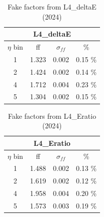 \begin{minipage}[t]{\textwidth}
  \begin{table}[H]
    \caption{Fake factors computed for several Loose', for year 2023}
    \label{tab:fjy_2023_loose1}
  \end{table}
\end{minipage}



\begin{minipage}[t]{\textwidth}

  \begin{minipage}[t]{0.32\textwidth}
    \begin{table}[H]
      \centering
      \begin{tabular}{|c|c|c|c|}
        \hline
        \multicolumn{4}{|c|}{\textbf{L4\_deltaE}} \\
        \hline
        $\eta$ bin & ff & $\sigma_{ff}$ & \% \\
        \hline
        1 & 1.323 & 0.002 & 0.15 \% \\
        \hline
        2 & 1.424 & 0.002 & 0.14 \% \\
        \hline
        4 & 1.712 & 0.004 & 0.23 \% \\
        \hline
        5 & 1.304 & 0.002 & 0.15 \% \\
        \hline
      \end{tabular}
      \caption{Fake factors from L4\_deltaE (2024)}
    \end{table}
  \end{minipage}
  \begin{minipage}[t]{0.32\textwidth}
    \begin{table}[H]
      \centering
      \begin{tabular}{|c|c|c|c|}
        \hline
        \multicolumn{4}{|c|}{\textbf{L4\_Eratio}} \\
        \hline
        $\eta$ bin & ff & $\sigma_{ff}$ & \% \\
        \hline
        1 & 1.488 & 0.002 & 0.13 \% \\
        \hline
        2 & 1.619 & 0.002 & 0.12 \% \\
        \hline
        4 & 1.958 & 0.004 & 0.20 \% \\
        \hline
        5 & 1.573 & 0.003 & 0.19 \% \\
        \hline
      \end{tabular}
      \caption{Fake factors from L4\_Eratio (2024)}
    \end{table}
  \end{minipage}
  \begin{minipage}[t]{0.32\textwidth}

\end{minipage}
\end{minipage}
